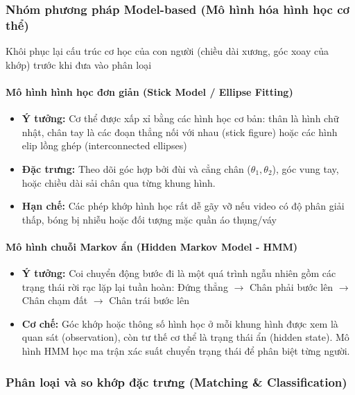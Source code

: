 \subsubsection{Nhóm phương pháp Model-based (Mô hình hóa hình học cơ thể)} 
Khôi phục lại cấu trúc cơ học của con người (chiều dài xương, góc xoay của khớp) trước khi đưa vào phân loại

\paragraph{Mô hình hình học đơn giản (Stick Model / Ellipse Fitting)}
\begin{itemize}
    \item \textbf{Ý tưởng:} Cơ thể được xấp xỉ bằng các hình học cơ bản: thân là hình chữ nhật, chân tay là các đoạn thẳng nối với nhau (stick figure) hoặc các hình elip lồng ghép (interconnected ellipses)
    \item \textbf{Đặc trưng:} Theo dõi góc hợp bởi đùi và cẳng chân ($\theta_1, \theta_2$), góc vung tay, hoặc chiều dài sải chân qua từng khung hình.
    \item \textbf{Hạn chế:} Các phép khớp hình học rất dễ gãy vỡ nếu video có độ phân giải thấp, bóng bị nhiễu hoặc đối tượng mặc quần áo thụng/váy
\end{itemize}

\paragraph{Mô hình chuỗi Markov ẩn (Hidden Markov Model - HMM)}

\begin{itemize}
    \item \textbf{Ý tưởng:} Coi chuyển động bước đi là một quá trình ngẫu nhiên gồm các trạng thái rời rạc lặp lại tuần hoàn: Đứng thẳng $\rightarrow$ Chân phải bước lên $\rightarrow$ Chân chạm đất $\rightarrow$ Chân trái bước lên
    \item \textbf{Cơ chế:} Góc khớp hoặc thông số hình học ở mỗi khung hình được xem là quan sát (observation), còn tư thế cơ thể là trạng thái ẩn (hidden state). Mô hình HMM học ma trận xác suất chuyển trạng thái để phân biệt từng người.
\end{itemize}

\subsubsection{Phân loại và so khớp đặc trưng (Matching \& Classification)}

